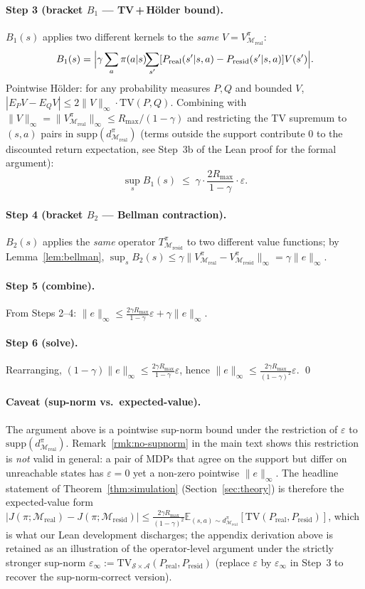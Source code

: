 \documentclass{article}
\theoremstyle{definition}
\newcommand{\Mreal}{\mathcal{M}_{\mathrm{real}}}
\newcommand{\Mresid}{\mathcal{M}_{\mathrm{resid}}}
\newcommand{\Preal}{P_{\mathrm{real}}}
\newcommand{\Presid}{P_{\mathrm{resid}}}
\newcommand{\Rmax}{R_{\max}}
\newcommand{\eps}{\varepsilon}
\newcommand{\supp}{\mathrm{supp}}
\newcommand{\Vpi}{V^{\pi}}
\newcommand{\dpi}{d^{\pi}}
\begin{document}
\paragraph{Step 3 (bracket $B_1$ --- TV\,+\,H\"older bound).}
$B_1(s)$ applies two different kernels to the \emph{same} $V=\Vpi_{\Mreal}$:
\[
B_1(s) = \Bigl|\gamma\sum_a \pi(a|s)\!\!\sum_{s'}[\Preal(s'|s,a)-\Presid(s'|s,a)]V(s')\Bigr|.
\]
Pointwise H\"older: for any probability measures $P,Q$ and bounded $V$,
$|E_P V - E_Q V| \le 2\|V\|_\infty \cdot \mathrm{TV}(P,Q)$.
Combining with $\|V\|_\infty=\|\Vpi_{\Mreal}\|_\infty\le \Rmax/(1-\gamma)$
and restricting the TV supremum to $(s,a)$ pairs in
$\supp(\dpi_{\Mreal})$ (terms outside the support contribute $0$ to
the discounted return expectation, see Step~3b of the Lean proof for
the formal argument):
\[
\sup_s B_1(s) \;\le\; \gamma\cdot\frac{2\Rmax}{1-\gamma}\cdot\eps.
\]

\paragraph{Step 4 (bracket $B_2$ --- Bellman contraction).}
$B_2(s)$ applies the \emph{same} operator $T^\pi_{\Mresid}$ to two
different value functions; by Lemma~\ref{lem:bellman},
$\sup_s B_2(s) \le \gamma\|\Vpi_{\Mreal}-\Vpi_{\Mresid}\|_\infty
= \gamma\|e\|_\infty$.

\paragraph{Step 5 (combine).}
From Steps 2--4: $\|e\|_\infty \le \tfrac{2\gamma\Rmax}{1-\gamma}\eps + \gamma\|e\|_\infty$.

\paragraph{Step 6 (solve).}
Rearranging, $(1-\gamma)\|e\|_\infty \le \tfrac{2\gamma\Rmax}{1-\gamma}\eps$,
hence $\|e\|_\infty \le \tfrac{2\gamma\Rmax}{(1-\gamma)^2}\eps$.
\qed

\paragraph{Caveat (sup-norm vs.\ expected-value).}
The argument above is a pointwise sup-norm bound under the
restriction of $\eps$ to $\supp(\dpi_{\Mreal})$.
Remark~\ref{rmk:no-supnorm} in the main text shows this restriction is
\emph{not} valid in general: a pair of MDPs that agree on the support
but differ on unreachable states has $\eps=0$ yet a non-zero pointwise
$\|e\|_\infty$.  The headline statement of
Theorem~\ref{thm:simulation} (Section~\ref{sec:theory}) is therefore
the expected-value form
$|J(\pi;\Mreal)-J(\pi;\Mresid)|\le\tfrac{2\gamma\Rmax}{(1-\gamma)^2}
\mathbb E_{(s,a)\sim d^\pi_{\Mreal}}[\mathrm{TV}(\Preal,\Presid)]$,
which is what our Lean development discharges; the appendix derivation
above is retained as an illustration of the operator-level argument
under the strictly stronger sup-norm $\eps_\infty:=
\mathrm{TV}_{\mathcal S\times\mathcal A}(\Preal,\Presid)$
(replace $\eps$ by $\eps_\infty$ in Step~3 to recover the
sup-norm-correct version).
\end{document}

